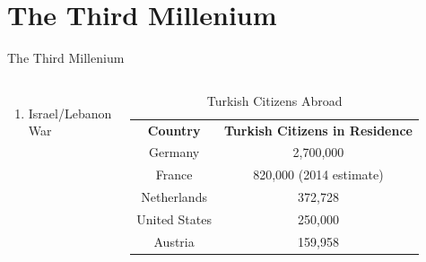 \documentclass{beamer}
\begin{document}
\section{The Third Millenium}
\begin{frame}{The Third Millenium}
	\begin{columns}
			\begin{enumerate}
				\item Israel/Lebanon War
			\end{enumerate}
		
		\begin{table}[ht]
			\centering
			\begin{tabular}{|c|c|}
				\hline
				\bf{Country} & \bf{Turkish Citizens in Residence}\\
				\hhline
				Germany & 2,700,000\\
				\hline
				France & 820,000 (2014 estimate)\\
				\hline
				Netherlands & 372,728\\
				\hline
				United States & 250,000\\
				\hline
				Austria & 159,958\\
				\hline
			\end{tabular}
			\caption{Turkish Citizens Abroad}
		\end{table}
	\end{columns}
\end{frame}
\end{document}
